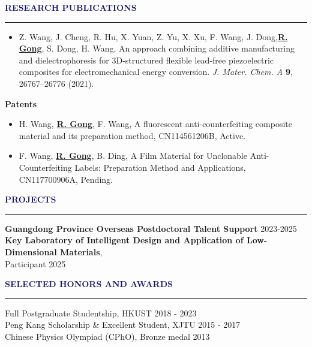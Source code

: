 \documentclass{resume} %
\renewenvironment{rSection}[1]{
\sectionskip
\textcolor{MidnightBlue}{\MakeUppercase{#1}}
\sectionlineskip
\hrule
\begin{list}{}{
\setlength{\leftmargin}{0em}
}
\item[]
}{
\end{list}
}
\begin{document}
\begin{rSection}{\textbf{Research Publications}}
{\begin{itemize}
    \item Z. Wang, J. Cheng, R. Hu, X. Yuan, Z. Yu, X. Xu, F. Wang, J. Dong,\underline{\textbf{R. Gong}}, S. Dong, H. Wang, An approach combining additive manufacturing and dielectrophoresis for 3D-structured flexible lead-free piezoelectric composites for electromechanical energy conversion. \textit{\textit{J. Mater. Chem. A}} \textbf{\textbf{9}}, 26767–26776 (2021).
\end{itemize}
\textbf{ Patents}
\begin{itemize}
    \item H. Wang, \underline{\textbf{R. Gong}}, F. Wang, A fluorescent anti-counterfeiting composite material and its preparation method, CN114561206B, Active.
    \item F. Wang, \underline{\textbf{R. Gong}}, B. Ding, A Film Material for Unclonable Anti-Counterfeiting Labels: Preparation Method and Applications, CN117700906A, Pending.
\end{itemize}



 }  
 
\end{rSection}



\begin{rSection}{\textbf{Projects}} \itemsep -3pt  

{\textbf{Guangdong Province Overseas Postdoctoral Talent Support}} \hfill 2023-2025 \\   
{\textbf{Key Laboratory of Intelligent Design and Application of Low-Dimensional Materials}, \\Participant} \hfill 2025\\     
\end{rSection}  
\begin{rSection}{\textbf{Selected Honors and Awards}} 
\itemsep -2pt
Full Postgraduate Studentship, HKUST  \hfill{2018 - 2023}\\
Peng Kang Scholarship \& Excellent Student, XJTU \hfill{2015 - 2017}\\
Chinese Physics Olympiad (CPhO), Bronze medal \hfill{2013} 

\end{rSection}
\end{document}
